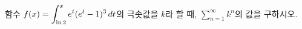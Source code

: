 \hspace*{2mm}\begin{minipage}[t]{\dimexpr\linewidth-2mm\relax}\vspace{0pt}
함수 $f(x)=\displaystyle\int_{\ln 2}^{x}e^t(e^t-1)^3\mkern3mu dt$의 극솟값을 $k$라 할 때, $\displaystyle\sum_{n=1}^{\infty}k^n$의 값을 구하시오.\end{minipage}

